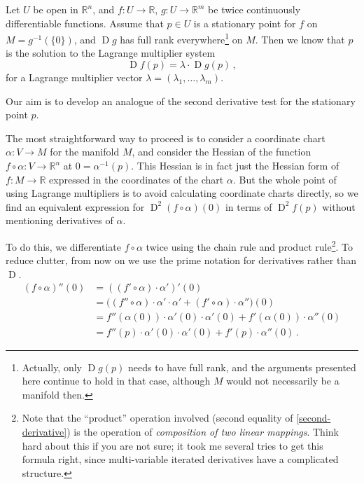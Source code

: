 \documentclass[12pt]{article}
\newcommand{\real}{\mathbb{R}}
\DeclareMathOperator{\D}{D}
\begin{document}
Let $U$ be open in $\real^n$,
and $f\colon U \to \real$, $g\colon U \to \real^m$ be twice continuously differentiable functions.
Assume that $p \in U$ is a stationary point
for $f$ on $M = g^{-1}(\{ 0 \})$,
and $\D g$ has full rank everywhere\footnote{Actually, only $\D g(p)$ needs to have full rank, and the arguments presented here continue to hold in that case, although $M$ would not necessarily be a manifold then.} on $M$.
Then we know that $p$ is the solution
to the Lagrange multiplier system
\begin{equation}\label{lagrange}
\D f(p) = \lambda \cdot \D g(p)\,,
\end{equation}
for a Lagrange multiplier vector $\lambda = (\lambda_1, \dotsc, \lambda_m)$.

Our aim is to develop an analogue of the second derivative test for the stationary point $p$.

The most straightforward way to proceed is to consider a coordinate chart $\alpha\colon V \to M$
for the manifold $M$, and consider the Hessian of the function $f \circ \alpha\colon V \to \real^n$
at $0 = \alpha^{-1}(p)$.  This Hessian is in fact just the Hessian form of $f \colon M \to \real$
expressed in the coordinates of the chart $\alpha$.  But the whole point of using Lagrange multipliers
is to avoid calculating coordinate charts directly, so we find an equivalent expression
for $\D^2 (f\circ \alpha)(0)$ in terms of $\D^2 f(p)$ without mentioning derivatives of $\alpha$.

To do this, we differentiate $f \circ \alpha$ twice using the chain rule and product
 rule\footnote{Note that the ``product'' operation involved (second equality of \eqref{second-derivative})
is the operation of \emph{composition of two linear mappings}.
Think hard about this if you are not sure; it took me several tries to get this formula right,
since multi-variable iterated derivatives have a complicated structure.}.
To reduce clutter, from now on we use the prime notation for derivatives rather than $\D$.
\begin{equation}\label{second-derivative}
\begin{split}
(f \circ \alpha)''(0) &= ((f' \circ \alpha) \cdot \alpha')'(0)  \\
&= \bigl ( (f'' \circ \alpha) \cdot \alpha' \cdot \alpha' + (f' \circ \alpha) \cdot \alpha'' \bigr) (0) \\
&= f''(\alpha(0)) \cdot \alpha'(0) \cdot \alpha'(0) + f'(\alpha(0)) \cdot \alpha''(0) \\
&= f''(p) \cdot \alpha'(0) \cdot \alpha'(0) + f'(p) \cdot \alpha''(0)\,.
\end{split}
\end{equation}
\end{document}
